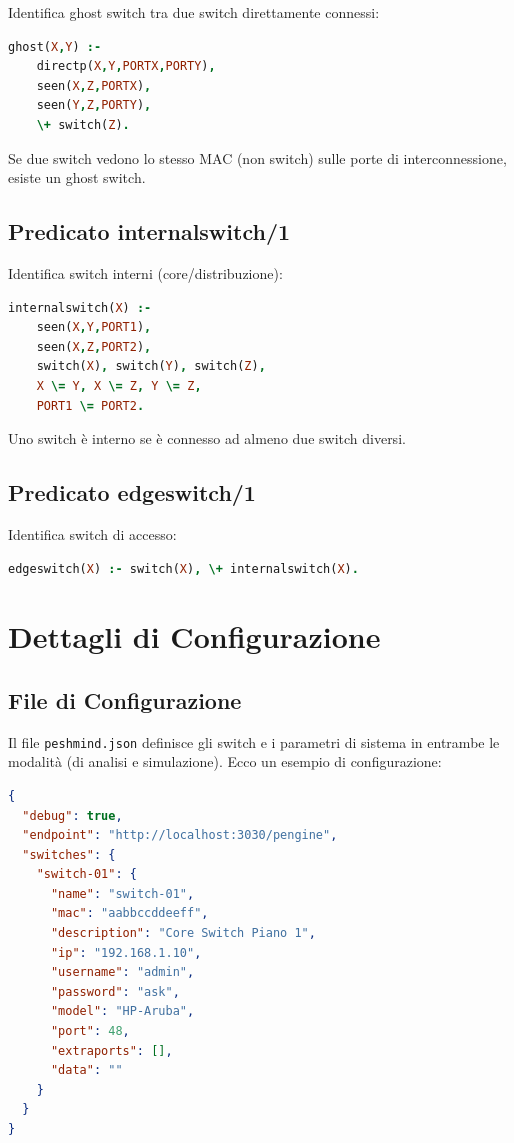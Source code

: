 \documentclass[12pt,a4paper]{article}
\begin{document}
Identifica ghost switch tra due switch direttamente connessi:

\begin{lstlisting}[language=Prolog]
ghost(X,Y) :- 
    directp(X,Y,PORTX,PORTY),
    seen(X,Z,PORTX),
    seen(Y,Z,PORTY),
    \+ switch(Z).
\end{lstlisting}

Se due switch vedono lo stesso MAC (non switch) sulle porte di interconnessione, esiste un ghost switch.

\subsection{Predicato internalswitch/1}

Identifica switch interni (core/distribuzione):

\begin{lstlisting}[language=Prolog]
internalswitch(X) :- 
    seen(X,Y,PORT1),
    seen(X,Z,PORT2),
    switch(X), switch(Y), switch(Z), 
    X \= Y, X \= Z, Y \= Z,
    PORT1 \= PORT2.
\end{lstlisting}

Uno switch è interno se è connesso ad almeno due switch diversi.

\subsection{Predicato edgeswitch/1}

Identifica switch di accesso:

\begin{lstlisting}[language=Prolog]
edgeswitch(X) :- switch(X), \+ internalswitch(X).
\end{lstlisting}

\section{Dettagli di Configurazione}
\label{sec:conf}

\subsection{File di Configurazione}

Il file \texttt{peshmind.json} definisce gli switch e i parametri di sistema in entrambe le modalità 
(di analisi e simulazione). Ecco un esempio di configurazione:

\begin{lstlisting}[language=json]
{
  "debug": true,
  "endpoint": "http://localhost:3030/pengine",
  "switches": {
    "switch-01": {
      "name": "switch-01",
      "mac": "aabbccddeeff",
      "description": "Core Switch Piano 1",
      "ip": "192.168.1.10",
      "username": "admin",
      "password": "ask",
      "model": "HP-Aruba",
      "port": 48,
      "extraports": [],
      "data": ""
    }
  }
}
\end{lstlisting}
\end{document}
